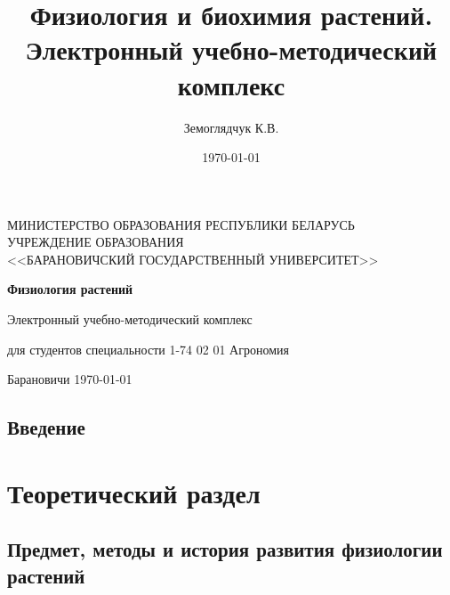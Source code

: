 \documentclass[12pt]{report}              %
\title{\bf Физиология и биохимия растений. Электронный учебно-методический комплекс}    %
\author{Земоглядчук К.В.}              %
\date{\today}                           %
\begin{document}

\thispagestyle{empty}
\begin{singlespace}

\begin{center}
МИНИСТЕРСТВО ОБРАЗОВАНИЯ РЕСПУБЛИКИ БЕЛАРУСЬ \\
УЧРЕЖДЕНИЕ ОБРАЗОВАНИЯ \\
<<БАРАНОВИЧСКИЙ ГОСУДАРСТВЕННЫЙ УНИВЕРСИТЕТ>>\\[3.5cm]
\end{center}


\begin{center}
\textbf{
\LARGE{Физиология растений}\\[1.5cm]}

Электронный учебно-методический комплекс

для студентов специальности 1-74 02 01 Агрономия\\[5cm]

\end{center}

\vspace{8 cm}

\begin{center}
Барановичи \today
\end{center}

\end{singlespace}

\pagebreak
\thispagestyle{empty}                             %

\pagebreak


\tableofcontents                     %

\pagebreak

\section*{Введение}
	
	\hypertarget{toc}{}
	
\chapter{Теоретический раздел}

		\section{Предмет, методы и история развития физиологии растений}
	
\end{document}
